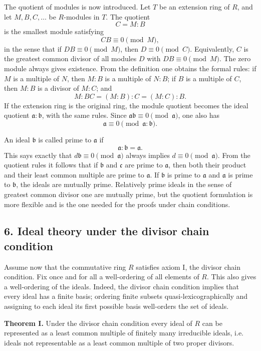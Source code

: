 \documentclass[12pt]{article}
\begin{document}
The quotient of modules is now introduced. Let $T$ be an extension ring of $R$, and let $M,B,C,\ldots$ be $R$-modules in $T$. The quotient
\[
  C=M:B
\]
is the smallest module satisfying
\[
  CB\equiv0\pmod M,
\]
in the sense that if $DB\equiv0\pmod M$, then $D\equiv0\pmod C$. Equivalently, $C$ is the greatest common divisor of all modules $D$ with $DB\equiv0\pmod M$. The zero module always gives existence. From the definition one obtains the formal rules: if $M$ is a multiple of $N$, then $M:B$ is a multiple of $N:B$; if $B$ is a multiple of $C$, then $M:B$ is a divisor of $M:C$; and
\[
  M:BC=(M:B):C=(M:C):B.
\]
If the extension ring is the original ring, the module quotient becomes the ideal quotient $\mathfrak a:\mathfrak b$, with the same rules. Since $\mathfrak a\mathfrak b\equiv0\pmod{\mathfrak a}$, one also has
\[
  \mathfrak a\equiv0\pmod{\mathfrak a:\mathfrak b}.
\]

An ideal $\mathfrak b$ is called prime to $\mathfrak a$ if
\[
  \mathfrak a:\mathfrak b=\mathfrak a.
\]
This says exactly that $d\mathfrak b\equiv0\pmod{\mathfrak a}$ always implies $d\equiv0\pmod{\mathfrak a}$. From the quotient rules it follows that if $\mathfrak b$ and $\mathfrak c$ are prime to $\mathfrak a$, then both their product and their least common multiple are prime to $\mathfrak a$. If $\mathfrak b$ is prime to $\mathfrak a$ and $\mathfrak a$ is prime to $\mathfrak b$, the ideals are mutually prime. Relatively prime ideals in the sense of greatest common divisor one are mutually prime, but the quotient formulation is more flexible and is the one needed for the proofs under chain conditions.

\subsection{6. Ideal theory under the divisor chain condition}

Assume now that the commutative ring $R$ satisfies axiom I, the divisor chain condition. Fix once and for all a well-ordering of all elements of $R$. This also gives a well-ordering of the ideals. Indeed, the divisor chain condition implies that every ideal has a finite basis; ordering finite subsets quasi-lexicographically and assigning to each ideal its first possible basis well-orders the set of ideals.

\textbf{Theorem I.} Under the divisor chain condition every ideal of $R$ can be represented as a least common multiple of finitely many irreducible ideals, i.e. ideals not representable as a least common multiple of two proper divisors.
\end{document}

